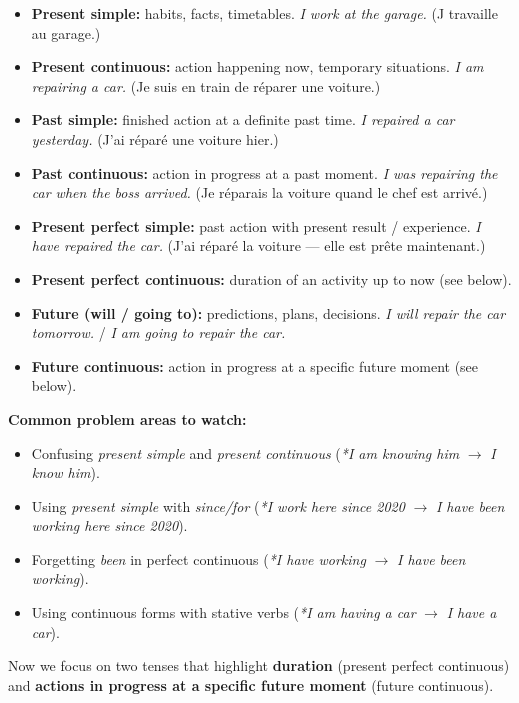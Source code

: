 \documentclass[11pt]{article}
\newcommand{\cle}[1]{{\popxbold\color{popdark}#1}}
\begin{document}
\begin{aretenir}
\begin{itemize}
    \item \textbf{Present simple:} habits, facts, timetables. \emph{I work at the garage.} (J travaille au garage.)
    \item \textbf{Present continuous:} action happening now, temporary situations. \emph{I am repairing a car.} (Je suis en train de réparer une voiture.)
    \item \textbf{Past simple:} finished action at a definite past time. \emph{I repaired a car yesterday.} (J'ai réparé une voiture hier.)
    \item \textbf{Past continuous:} action in progress at a past moment. \emph{I was repairing the car when the boss arrived.} (Je réparais la voiture quand le chef est arrivé.)
    \item \textbf{Present perfect simple:} past action with present result / experience. \emph{I have repaired the car.} (J'ai réparé la voiture — elle est prête maintenant.)
    \item \textbf{Present perfect continuous:} \cle{duration} of an activity up to now (see below).
    \item \textbf{Future (will / going to):} predictions, plans, decisions. \emph{I will repair the car tomorrow.} / \emph{I am going to repair the car.}
    \item \textbf{Future continuous:} action in progress at a specific future moment (see below).
\end{itemize}
\textbf{Common problem areas to watch:}
\begin{itemize}
    \item Confusing \emph{present simple} and \emph{present continuous} (\emph{*I am knowing him} $\rightarrow$ \emph{I know him}).
    \item Using \emph{present simple} with \emph{since/for} (\emph{*I work here since 2020} $\rightarrow$ \emph{I have been working here since 2020}).
    \item Forgetting \emph{been} in perfect continuous (\emph{*I have working} $\rightarrow$ \emph{I have been working}).
    \item Using continuous forms with stative verbs (\emph{*I am having a car} $\rightarrow$ \emph{I have a car}).
\end{itemize}
\end{aretenir}

Now we focus on two tenses that highlight \textbf{duration} (present perfect continuous) and \textbf{actions in progress at a specific future moment} (future continuous).
\end{document}
